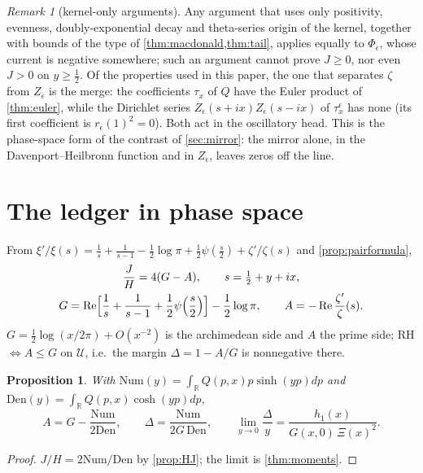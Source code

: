 \documentclass[11pt]{article}
\newtheorem{proposition}[theorem]{Proposition}
\theoremstyle{definition}\newtheorem{definition}[theorem]{Definition}
\theoremstyle{remark}\newtheorem{remark}[theorem]{Remark}
\newcommand{\R}{\mathbb R}\newcommand{\C}{\mathbb C}\newcommand{\N}{\mathbb N}
\newcommand{\Num}{\mathrm{Num}}\newcommand{\Den}{\mathrm{Den}}
\renewcommand{\Re}{\operatorname{Re}}\renewcommand{\Im}{\operatorname{Im}}
\begin{document}
\begin{remark}[kernel-only arguments]\label{rem:nogo}
Any argument that uses only positivity, evenness, doubly-exponential decay and theta-series origin of the kernel, together with bounds of the type of \cref{thm:macdonald,thm:tail}, applies equally to $\Phi_\epsilon$, whose current is negative somewhere; such an argument cannot prove $J\ge0$, nor even $J>0$ on $y\ge\frac12$. Of the properties used in this paper, the one that separates $\zeta$ from $Z_\epsilon$ is the merge: the coefficients $\tau_x$ of $Q$ have the Euler product of \cref{thm:euler}, while the Dirichlet series $Z_\epsilon(s+ix)Z_\epsilon(s-ix)$ of $\tau^\epsilon_x$ has none (its first coefficient is $r_\epsilon(1)^2=0$). Both act in the oscillatory head. This is the phase-space form of the contrast of \cref{sec:mirror}: the mirror alone, in the Davenport--Heilbronn function and in $Z_\epsilon$, leaves zeros off the line.
\end{remark}

\section{The ledger in phase space}\label{sec:ledger}

From $\xi'/\xi(s)=\frac1s+\frac1{s-1}-\frac12\log\pi+\frac12\psi(\frac s2)+\zeta'/\zeta(s)$ and \cref{prop:pairformula},
\begin{gather*}
\frac JH=4(G-A),\qquad s=\tfrac12+y+ix,\\
G=\Re\Bigl[\frac1s+\frac1{s-1}+\frac12\psi\Bigl(\frac s2\Bigr)\Bigr]-\frac12\log\pi,\qquad A=-\Re\frac{\zeta'}\zeta(s).
\end{gather*}
$G=\frac12\log(x/2\pi)+O(x^{-2})$ is the archimedean side and $A$ the prime side; RH $\iff A\le G$ on $\mathcal U$, i.e.\ the margin $\Delta=1-A/G$ is nonnegative there.

\begin{proposition}\label{prop:ledger}
With $\Num(y)=\int_\R Q(p,x)p\sinh(yp)dp$ and $\Den(y)=\int_\R Q(p,x)\cosh(yp)dp$,
\[
A=G-\frac{\Num}{2\Den},\qquad\Delta=\frac{\Num}{2G\,\Den},\qquad\lim_{y\to0}\frac\Delta y=\frac{h_1(x)}{G(x,0)\,\Xi(x)^2}.
\]
\end{proposition}
\begin{proof}
$J/H=2\Num/\Den$ by \cref{prop:HJ}; the limit is \cref{thm:moments}.
\end{proof}
\end{document}
